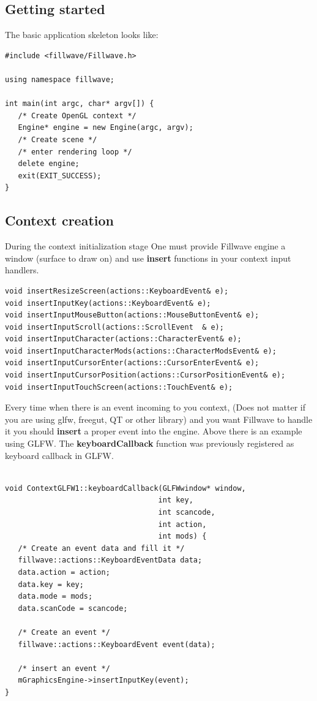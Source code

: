 \documentclass{article}
\begin{document}
\subsection{Getting started}\label{sec:Getting started}
\indent \indent The basic application skeleton looks like:

\begin{lstlisting}
#include <fillwave/Fillwave.h>

using namespace fillwave;

int main(int argc, char* argv[]) {
   /* Create OpenGL context */
   Engine* engine = new Engine(argc, argv);
   /* Create scene */
   /* enter rendering loop */
   delete engine;
   exit(EXIT_SUCCESS);
}
\end{lstlisting}

\subsection{Context creation}\label{sec:Context}
\indent \indent During the context initialization stage One must provide Fillwave engine a window (surface to draw on) and use \textbf{insert} functions in your context input handlers.

\begin{lstlisting}
void insertResizeScreen(actions::KeyboardEvent& e);
void insertInputKey(actions::KeyboardEvent& e);
void insertInputMouseButton(actions::MouseButtonEvent& e);
void insertInputScroll(actions::ScrollEvent  & e);
void insertInputCharacter(actions::CharacterEvent& e);
void insertInputCharacterMods(actions::CharacterModsEvent& e);
void insertInputCursorEnter(actions::CursorEnterEvent& e);
void insertInputCursorPosition(actions::CursorPositionEvent& e);
void insertInputTouchScreen(actions::TouchEvent& e);
\end{lstlisting}

\indent \indent Every time when there is an event incoming to you context, (Does not matter if you are using glfw, freegut, QT or other library) and you want Fillwave to handle it you should \textbf{insert} a proper event into the engine. Above there is an example using GLFW. The \textbf{keyboardCallback} function was previously registered as keyboard callback in GLFW.  

\begin{lstlisting}

void ContextGLFW1::keyboardCallback(GLFWwindow* window,
                                   int key,
                                   int scancode,
                                   int action,
                                   int mods) {
   /* Create an event data and fill it */
   fillwave::actions::KeyboardEventData data;
   data.action = action;
   data.key = key;
   data.mode = mods;
   data.scanCode = scancode;
   
   /* Create an event */
   fillwave::actions::KeyboardEvent event(data);
   
   /* insert an event */
   mGraphicsEngine->insertInputKey(event);
}
\end{lstlisting}
\end{document}
